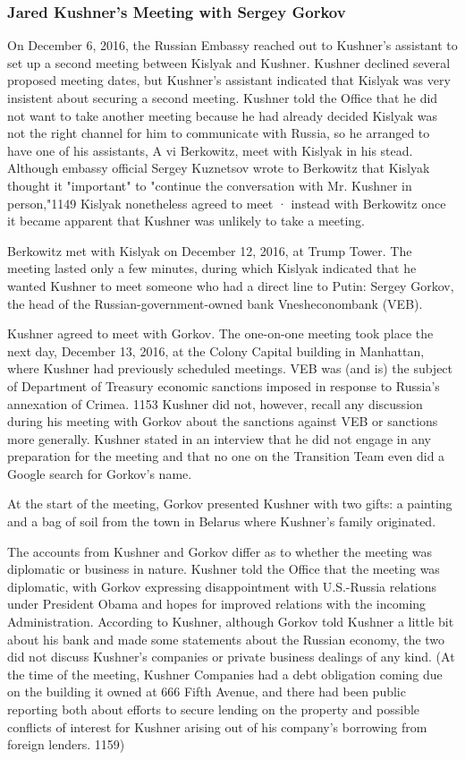 \subsubsection{Jared Kushner's Meeting with Sergey Gorkov}

On December 6, 2016, the Russian Embassy reached out to Kushner's assistant to set up a second meeting between Kislyak and Kushner.%
Kushner declined several proposed meeting dates, but Kushner's assistant indicated that Kislyak was very insistent about securing a second meeting.%
Kushner told the Office that he did not want to take another meeting because he had already decided Kislyak was not the right channel for him to communicate with Russia, so he arranged to have one of his assistants, A vi Berkowitz, meet with Kislyak in his stead.%
Although embassy official Sergey Kuznetsov wrote to Berkowitz that Kislyak thought it "important" to "continue the conversation with Mr. Kushner in person,"1149 Kislyak nonetheless agreed to meet · instead with Berkowitz once it became apparent that Kushner was unlikely to take a meeting.

Berkowitz met with Kislyak on December 12, 2016, at Trump Tower.%
The meeting lasted only a few minutes, during which Kislyak indicated that he wanted Kushner to meet someone who had a direct line to Putin: Sergey Gorkov, the head of the Russian-government-owned bank Vnesheconombank (VEB).

Kushner agreed to meet with Gorkov.%
The one-on-one meeting took place the next day, December 13, 2016, at the Colony Capital building in Manhattan, where Kushner had previously scheduled meetings.%
VEB was (and is) the subject of Department of Treasury economic sanctions imposed in response to Russia's annexation of Crimea. 1153 Kushner did not, however, recall any discussion during his meeting with Gorkov about the sanctions against VEB or sanctions more generally.%
Kushner stated in an interview that he did not engage in any preparation for the meeting and that no one on the Transition Team even did a Google search for Gorkov's name.%

At the start of the meeting, Gorkov presented Kushner with two gifts: a painting and a bag of soil from the town in Belarus where Kushner's family originated.%

The accounts from Kushner and Gorkov differ as to whether the meeting was diplomatic or business in nature. Kushner told the Office that the meeting was diplomatic, with Gorkov expressing disappointment with U.S.-Russia relations under President Obama and hopes for improved relations with the incoming Administration.%
According to Kushner, although Gorkov told Kushner a little bit about his bank and made some statements about the Russian economy, the two did not discuss Kushner's companies or private business dealings of any kind.%
(At the time of the meeting, Kushner Companies had a debt obligation coming due on the building it owned at 666 Fifth Avenue, and there had been public reporting both about efforts to secure lending on the property and possible conflicts of interest for Kushner arising out of his company's borrowing from foreign lenders. 1159)

